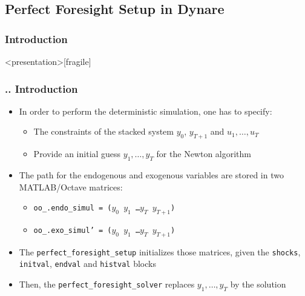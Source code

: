 \documentclass[11pt,aspectratio=169]{beamer}
\begin{document}
\subsection{Perfect Foresight Setup in Dynare}
\subsubsection{Introduction}
\begin{frame}<presentation>[fragile]
	\frametitle{{\thesection.\thesubsection.\thesubsubsection} Introduction}
	\begin{itemize}
		\item In order to perform the deterministic simulation, one has to specify:
		\begin{itemize}
			\item The constraints of the stacked system $y_0$, $y_{T+1}$ and $u_1, \ldots , u_T$
			\item Provide an initial guess $y_1, \ldots , y_T$ for the Newton algorithm 
		\end{itemize} 
		\item The path for the endogenous and exogenous variables are stored in two MATLAB/Octave matrices:
		\begin{itemize}
			\item \texttt{oo\_.endo\_simul = ($y_0$  $y_1$ \ldots \enspace  $y_T$  $y_{T+1}$)}
			\item \texttt{oo\_.exo\_simul' = ($y_0$  $y_1$ \ldots \enspace  $y_T$  $y_{T+1}$)}
		\end{itemize}
		\item The \texttt{perfect\_foresight\_setup} initializes those matrices, given the \texttt{shocks}, \texttt{initval}, \texttt{endval} and \texttt{histval} blocks
		\item Then, the \texttt{perfect\_foresight\_solver} replaces $y_1,\ldots,y_T$ by the solution 
	\end{itemize}
\end{frame}
\end{document}

